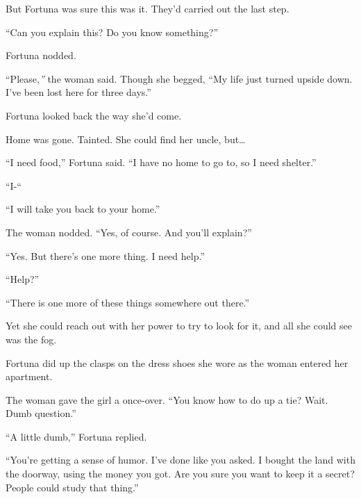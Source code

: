 But Fortuna was sure this was it.  They'd carried out the last step.



``Can you explain this?  Do you know something?''



Fortuna nodded.



``Please,\emph{'' }the woman said.  Though she begged,   ``My life just turned upside down.  I've been lost here for three days.''



Fortuna looked back the way she'd come.



Home was gone.  Tainted.  She could find her uncle, but\ldots



``I need food,'' Fortuna said.  ``I have no home to go to, so I need shelter.''



``I-``



``I will take you back to your home.''



The woman nodded.  ``Yes, of course.  And you'll explain?''



``Yes.  But there's one more thing.  I need help.''



``Help?''



``There is one more of these things somewhere out there.''



Yet she could reach out with her power to try to look for it, and all she could see was the fog.



\blacksquare



Fortuna did up the clasps on the dress shoes she wore as the woman entered her apartment.



The woman gave the girl a once-over.  ``You know how to do up a tie?  Wait.  Dumb question.''



``A little dumb,'' Fortuna replied.



``You're getting a sense of humor.  I've done like you asked.  I bought the land with the doorway, using the money you got.  Are you sure you want to keep it a secret?  People could study that thing.''



